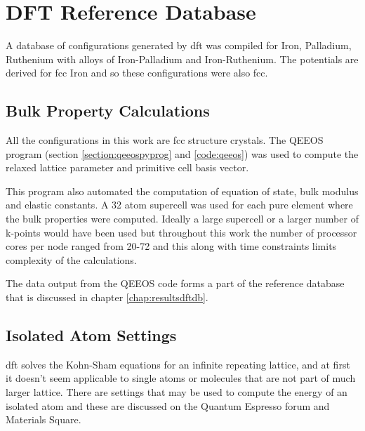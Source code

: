 

\section{DFT Reference Database}

A database of configurations generated by \acrshort{dft} was compiled for Iron, Palladium, Ruthenium with alloys of Iron-Palladium and Iron-Ruthenium.  The potentials are derived for \acrshort{fcc} Iron and so these configurations were also \acrshort{fcc}.


\subsection{Bulk Property Calculations}

All the configurations in this work are \acrshort{fcc} structure crystals.  The QEEOS program (section \ref{section:qeeospyprog} and \ref{code:qeeos}) was used to compute the relaxed lattice parameter and primitive cell basis vector.

This program also automated the computation of equation of state, bulk modulus and elastic constants.  A 32 atom supercell was used for each pure element where the bulk properties were computed.  Ideally a large supercell or a larger number of k-points would have been used but throughout this work the number of processor cores per node ranged from 20-72 and this along with time constraints limits complexity of the calculations.

The data output from the QEEOS code forms a part of the reference database that is discussed in chapter \ref{chap:resultsdftdb}.



\subsection{Isolated Atom Settings}

\acrlong{dft} solves the Kohn-Sham equations for an infinite repeating lattice, and at first it doesn't seem applicable to single atoms or molecules that are not part of much larger lattice.  There are settings that may be used to compute the energy of an isolated atom and these are discussed on the Quantum Espresso forum\cite{qeforum} and Materials Square\cite{materialssquaresingleatom}. 

